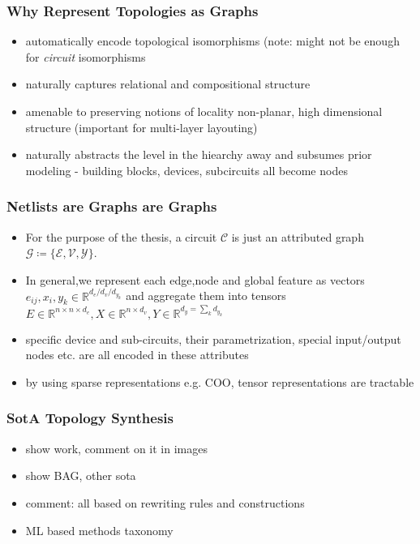 \documentclass[./presentation.tex]{subfiles}
\begin{document}
\begin{frame}[label=todo]
\frametitle{Why Represent Topologies as Graphs}
\begin{itemize}
  \item automatically encode topological isomorphisms (note: might not be enough for \emph{circuit} isomorphisms \cite{wangFunctionalityMattersNetlist2022c}
  \item naturally captures relational and compositional structure
  \item amenable to preserving notions of locality non-planar, high dimensional structure (important for multi-layer layouting)
  \item naturally abstracts the level in the hiearchy away and subsumes prior modeling - building blocks, devices, subcircuits all become nodes
\end{itemize}
\end{frame}

\begin{frame}[label=working]
  \frametitle{Netlists are Graphs are Graphs}
  \begin{itemize}
    \item For the purpose of the thesis, a circuit $\mathcal{C}$ is just an attributed graph $\mathcal{G}\coloneq \lbrace\mathcal{E},\mathcal{V},\mathcal{Y} \rbrace$.
    \item In general,we represent each edge,node and global feature as vectors $e_{ij},x_i,y_k \in \mathbb{R}^{d_e/d_v/d_{y_k}}$ and aggregate them into tensors $E\in\mathbb{R}^{n\times n \times d_e},X\in\mathbb{R}^{n\times d_v},Y\in\mathbb{R}^{d_y=\sum_k d_{y_k}}$
    \item specific device and sub-circuits, their parametrization, special input/output nodes etc. are all encoded in these attributes
    \item  by using sparse representations e.g. COO, tensor representations are tractable
  \end{itemize}
\end{frame}

\begin{frame}[label=working]
\frametitle{SotA Topology Synthesis}
\begin{itemize}
  \item show \cite{zhaoAutomatedTopologySynthesis2022a} work, comment on it in images
  \item show BAG, other sota
  \item comment: all based on rewriting rules and constructions
  \item ML based methods taxonomy
\end{itemize}
\end{frame}
\end{document}
